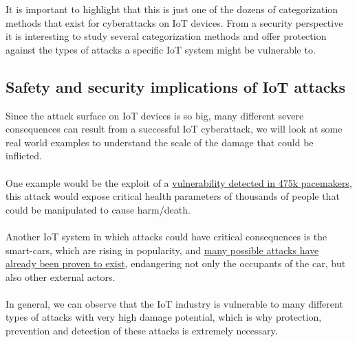 It is important to highlight that this is just one of the dozens of categorization methods that exist for cyberattacks on IoT devices. From a security perspective it is interesting to study several categorization methods and offer protection against the types of attacks a specific IoT system might be vulnerable to.\\


\subsection{Safety and security implications of IoT attacks}
Since the attack surface on IoT devices is so big, many different severe consequences can result from a successful IoT cyberattack, we will look at some real world examples to understand the scale of the damage that could be inflicted.
\\~\\
One example would be the exploit of a \hyperlink{https://thehealthcareblog.com/blog/2019/07/29/security-crisis-of-cardiac-pacemakers-paves-the-way-for-iot-security-evolution-in-cardiology/}{vulnerability detected in 475k pacemakers}, this attack would expose critical health parameters of thousands of people that could be manipulated to cause harm/death.
\\~\\
Another IoT system in which attacks could have critical consequences is the smart-cars, which are rising in popularity, and \hyperlink{https://www.lifewire.com/how-self-driving-cars-can-be-hacked-5114337}{many possible attacks have already been proven to exist}, endangering not only the occupants of the car, but also other external actors. 
\\~\\
In general, we can observe that the IoT industry is vulnerable to many different types of attacks with very high damage potential, which is why protection, prevention and detection of these attacks is extremely necessary.


